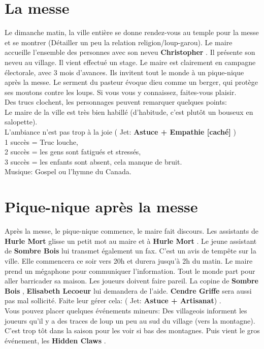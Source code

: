 \documentclass[oneside,12pt]{book}
\newcommand\roll[1]{
( Jet: \textbf{#1})
}
\newcommand{\Luke}{\textbf{Cendre Griffe} }
\newcommand{\Peter}{\textbf{Hurle Mort} }
\newcommand{\Leonard}{\textbf{Sombre Bois} }
\newcommand{\Elisabeth}{\textbf{Elisabeth Lecoeur} }
\newcommand{\Christopher}{\textbf{Christopher} }
\newcommand{\Hidden}{\textbf{Hidden Claws} }
\begin{document}
\begin{flushleft}
\section{La messe}
Le dimanche matin, la ville entière se donne rendez-vous au temple pour la messe et se montrer (Détailler un peu la relation religion/loup-garou). 
Le maire accueille l'ensemble des personnes avec son neveu \Christopher. Il présente son neveu au village. Il vient effectué un stage. Le maire est clairement en campagne électorale, avec 3 mois d'avances. Ils invitent tout le monde à un pique-nique après la messe.
Le serment du pasteur évoque dieu comme un berger, qui protège ses moutons contre les loups. Si vous vous y connaissez, faites-vous plaisir. \\ 
Des trucs clochent, les personnages peuvent remarquer quelques points: \\
Le maire de la ville est très bien habillé (d'habitude, c'est plutôt un bouseux en salopette).\\ 
L'ambiance n'est pas trop à la joie \roll{Astuce + Empathie [caché] }\\  1 succès = Truc louche,\\  2 succès = les gens sont fatigués et stressés,\\  3 succès = les enfants sont absent, cela manque de bruit.\\
Musique: Gospel ou l'hymne du Canada.

\section{Pique-nique après la messe}
Après la messe, le pique-nique commence, le maire fait discours. Les assistants de \Peter glisse un petit mot au maire et à \Peter. Le jeune assistant de \Leonard lui transmet également un fax. C'est un avis de tempête sur la ville. Elle commencera ce soir vers 20h et durera jusqu’à 2h du matin. Le maire prend un mégaphone pour communiquer l'information. Tout le monde part pour aller barricader sa maison. 
Les joueurs doivent faire pareil. La copine de \Leonard, \Elisabeth lui demandera de l'aide. \Luke sera aussi pas mal sollicité. Faite leur gérer cela: \roll{Astuce + Artisanat}.  \\

Vous pouvez placer quelques événements mineurs: Des villageois informent les joueurs qu'il y a des traces de loup un peu au sud du village (vers la montagne). C'est trop tôt dans la saison pour les voir si bas des montagnes.
Puis vient le gros événement, les \Hidden.


\end{flushleft}
\end{document}
